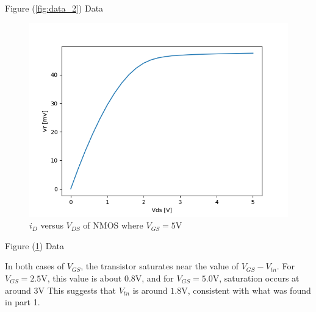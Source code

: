 \FloatBarrier

\begin{table}[h!]
	\centering
	\caption{Figure (\ref{fig:data_2}) Data}
	\label{tab:data_2}
\end{table}

\FloatBarrier

\begin{figure}[h!]
	\centering
	\includegraphics[scale=0.75]{./images/data_2_b.PNG}
	\caption{$i_{D}$ versus $V_{DS}$ of NMOS where $V_{GS}= 5$\si{\volt}}
	\label{fig:data_2b}
\end{figure}
\FloatBarrier

\FloatBarrier

\begin{table}[h!]
	\centering
	\caption{Figure (\ref{fig:data_2b}) Data}
	\label{tab:data_2b}
\end{table}

In both cases of $V_{GS}$, the transistor saturates near the value of $V_{GS} - V_{tn}$.
For $V_{GS} = 2.5$\si{\volt}, this value is about $0.8$\si{\volt}, and for $V_{GS} = 5.0$\si{\volt}, saturation occurs at around $3$\si{\volt}
This suggests that $V_{tn}$ is around $1.8$\si{\volt}, consistent with what was found in part 1.
